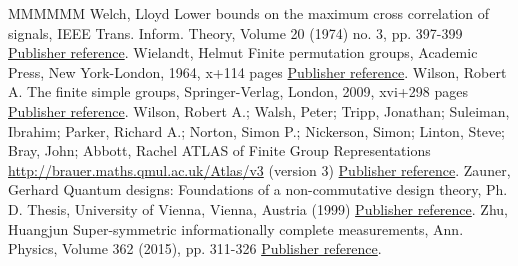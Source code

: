 \documentclass[11pt]{article}
\theoremstyle{definition}
\numberwithin{equation}{section}
\begin{document}
\begin{thebibliography}{MMMMMM}
 Welch, Lloyd Lower bounds on the maximum cross correlation of signals, IEEE Trans. Inform. Theory, Volume 20 (1974) no. 3, pp. 397-399 \href{https://alco.centre-mersenne.org/articles/10.5802/alco.324/#Welch:74}{Publisher reference}.
 Wielandt, Helmut Finite permutation groups, Academic Press, New York-London, 1964, x+114 pages \href{https://alco.centre-mersenne.org/articles/10.5802/alco.324/#Wielandt:64}{Publisher reference}.
 Wilson, Robert A. The finite simple groups, Springer-Verlag, London, 2009, xvi+298 pages \href{https://alco.centre-mersenne.org/articles/10.5802/alco.324/#Wilson:09}{Publisher reference}.
 Wilson, Robert A.; Walsh, Peter; Tripp, Jonathan; Suleiman, Ibrahim; Parker, Richard A.; Norton, Simon P.; Nickerson, Simon; Linton, Steve; Bray, John; Abbott, Rachel ATLAS of Finite Group Representations \url{http://brauer.maths.qmul.ac.uk/Atlas/v3} (version 3) \href{https://alco.centre-mersenne.org/articles/10.5802/alco.324/#AtlasRep}{Publisher reference}.
 Zauner, Gerhard Quantum designs: Foundations of a non-commutative design theory, Ph. D. Thesis, University of Vienna, Vienna, Austria (1999) \href{https://alco.centre-mersenne.org/articles/10.5802/alco.324/#Zauner:99}{Publisher reference}.
 Zhu, Huangjun Super-symmetric informationally complete measurements, Ann. Physics, Volume 362 (2015), pp. 311-326 \href{https://alco.centre-mersenne.org/articles/10.5802/alco.324/#Zhu:15}{Publisher reference}.
\end{thebibliography}
\end{document}

